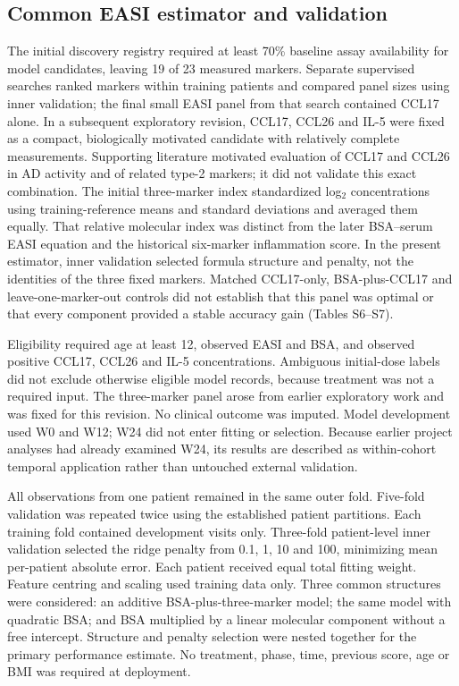 \documentclass[10pt,a4paper]{article}
\begin{document}
\subsection{Common EASI estimator and validation}
The initial discovery registry required at least 70\% baseline assay availability for model candidates, leaving 19 of 23 measured markers. Separate supervised searches ranked markers within training patients and compared panel sizes using inner validation; the final small EASI panel from that search contained CCL17 alone. In a subsequent exploratory revision, CCL17, CCL26 and IL-5 were fixed as a compact, biologically motivated candidate with relatively complete measurements. Supporting literature motivated evaluation of CCL17 and CCL26 in AD activity and of related type-2 markers; it did not validate this exact combination.\citep{Holm2021Immunoinflammatory,Kagami2003CCL26} The initial three-marker index standardized log$_2$ concentrations using training-reference means and standard deviations and averaged them equally. That relative molecular index was distinct from the later BSA--serum EASI equation and the historical six-marker inflammation score. In the present estimator, inner validation selected formula structure and penalty, not the identities of the three fixed markers. Matched CCL17-only, BSA-plus-CCL17 and leave-one-marker-out controls did not establish that this panel was optimal or that every component provided a stable accuracy gain (Tables S6--S7).

Eligibility required age at least 12, observed EASI and BSA, and observed positive CCL17, CCL26 and IL-5 concentrations. Ambiguous initial-dose labels did not exclude otherwise eligible model records, because treatment was not a required input. The three-marker panel arose from earlier exploratory work and was fixed for this revision. No clinical outcome was imputed. Model development used W0 and W12; W24 did not enter fitting or selection. Because earlier project analyses had already examined W24, its results are described as within-cohort temporal application rather than untouched external validation.

All observations from one patient remained in the same outer fold. Five-fold validation was repeated twice using the established patient partitions. Each training fold contained development visits only. Three-fold patient-level inner validation selected the ridge penalty from 0.1, 1, 10 and 100, minimizing mean per-patient absolute error. Each patient received equal total fitting weight. Feature centring and scaling used training data only. Three common structures were considered: an additive BSA-plus-three-marker model; the same model with quadratic BSA; and BSA multiplied by a linear molecular component without a free intercept. Structure and penalty selection were nested together for the primary performance estimate. No treatment, phase, time, previous score, age or BMI was required at deployment.
\end{document}
